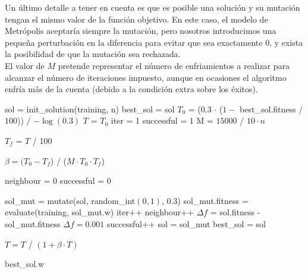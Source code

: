 \documentclass[12pt]{article}
\begin{document}
Un último detalle a tener en cuenta es que es posible una solución y su mutación tengan el mismo valor de la función objetivo. En este caso, el modelo de Metrópolis aceptaría siempre la mutación, pero nosotros introducimos una pequeña perturbación en la diferencia para evitar que sea exactamente $0$, y exista la posibilidad de que la mutación sea rechazada.\\

El valor de $M$ pretende representar el número de enfriamientos a realizar para alcanzar el número de iteraciones impuesto, aunque en ocasiones el algoritmo enfría más de la cuenta (debido a la condición extra sobre los éxitos).

\begin{algorithm}[h!]
\begin{algorithmic}


\State sol = init\_solution(training, n)  
\State best\_sol = sol
\State $T_0$ = ($0.3$ $\cdot$ ($1 - $ best\_sol.fitness $/$ $100$)) / $- \log(0.3)$
\State $T$ = $T_0$
\State iter = 1
\State successful = 1
\State M = $ 15000$ / $10 \cdot n$

 
    \State $T_f$ = $T$ / 100
\EndWhile

\State $\beta = (T_0 - T_f$) / ($M \cdot T_0 \cdot T_f$)

    \State neighbour = 0
    \State successful = 0

    \State sol\_mut = mutate(sol, random\_int$(0,1)$, 0.3)
    \State sol\_mut.fitness = evaluate(training, sol\_mut.w)
    \State iter++
    \State neighbour++
    \State $\Delta f$ = sol.fitness - sol\_mut.fitness
        \State $\Delta f = 0.001$
    \EndIf 
      
        \State successful++
        \State sol = sol\_mut
            \State best\_sol = sol
        \EndIf
    \EndIf
    \EndWhile
    
    \State $T = T$ / $(1 + \beta \cdot T)$  

\EndWhile

\Return best\_sol.w

\EndFunction
\end{algorithmic}
\end{algorithm}
\end{document}
